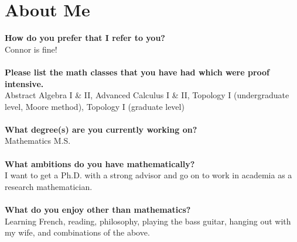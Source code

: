 \documentclass[12pt]{article}
\theoremstyle{definition}
\begin{document}
\section*{About Me}

\textbf{How do you prefer that I refer to you?} \\
Connor is fine!
\\\\
\textbf{Please list the math classes that you have had which were proof intensive.} \\
Abstract Algebra I \& II, Advanced Calculus I \& II, Topology I (undergraduate level, Moore method), Topology I (graduate level)
\\\\
\textbf{What degree(s) are you currently working on?} \\
Mathematics M.S.
\\\\
\textbf{What ambitions do you have mathematically?} \\
I want to get a Ph.D. with a strong advisor and go on to work in academia as a research mathematician.
\\\\
\textbf{What do you enjoy other than mathematics?} \\
Learning French, reading, philosophy, playing the bass guitar, hanging out with my wife, and combinations of the above.
\\\\
\end{document}

